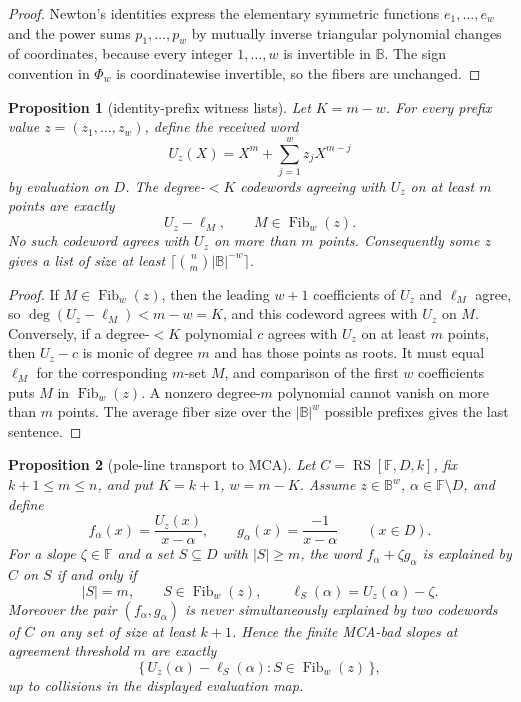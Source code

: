 \documentclass[a4paper,11pt]{amsart}
\newtheorem{proposition}[proposition]{Proposition}
\theoremstyle{remark}
\newcommand{\F}{\mathbb F}
\newcommand{\B}{\mathbb B}
\newcommand{\RS}{\operatorname{RS}}
\newcommand{\Fib}{\operatorname{Fib}}
\begin{document}
\begin{proof}
Newton's identities express the elementary symmetric functions \(e_1,\ldots,e_w\) and the power sums \(p_1,\ldots,p_w\) by mutually inverse triangular polynomial changes of coordinates, because every integer \(1,\ldots,w\) is invertible in \(\B\).  The sign convention in \(\Phi_w\) is coordinatewise invertible, so the fibers are unchanged.
\end{proof}

\begin{proposition}[identity-prefix witness lists]\label{prop:prefix-witness}
Let \(K=m-w\).  For every prefix value \(z=(z_1,\ldots,z_w)\), define the received word
\[
        U_z(X)=X^m+\sum_{j=1}^{w}z_jX^{m-j}
\]
by evaluation on \(D\).  The degree-\(<K\) codewords agreeing with \(U_z\) on at least \(m\) points are exactly
\[
        U_z-\ell_M,\qquad M\in\Fib_w(z).
\]
No such codeword agrees with \(U_z\) on more than \(m\) points.  Consequently some \(z\) gives a list of size at least \(\lceil \binom{n}{m}|\B|^{-w}\rceil\).
\end{proposition}

\begin{proof}
If \(M\in\Fib_w(z)\), then the leading \(w+1\) coefficients of \(U_z\) and \(\ell_M\) agree, so \(\deg(U_z-\ell_M)<m-w=K\), and this codeword agrees with \(U_z\) on \(M\).  Conversely, if a degree-\(<K\) polynomial \(c\) agrees with \(U_z\) on at least \(m\) points, then \(U_z-c\) is monic of degree \(m\) and has those points as roots.  It must equal \(\ell_M\) for the corresponding \(m\)-set \(M\), and comparison of the first \(w\) coefficients puts \(M\) in \(\Fib_w(z)\).  A nonzero degree-\(m\) polynomial cannot vanish on more than \(m\) points.  The average fiber size over the \(|\B|^w\) possible prefixes gives the last sentence.
\end{proof}

\begin{proposition}[pole-line transport to MCA]\label{prop:pole-line}
Let \(C=\RS[\F,D,k]\), fix \(k+1\le m\le n\), and put \(K=k+1\), \(w=m-K\).  Assume \(z\in\B^w\), \(\alpha\in\F\setminus D\), and define
\[
        f_\alpha(x)=\frac{U_z(x)}{x-\alpha},
        \qquad
        g_\alpha(x)=\frac{-1}{x-\alpha}\qquad(x\in D).
\]
For a slope \(\zeta\in\F\) and a set \(S\subseteq D\) with \(|S|\ge m\), the word \(f_\alpha+\zeta g_\alpha\) is explained by \(C\) on \(S\) if and only if
\[
        |S|=m,\qquad S\in\Fib_w(z),\qquad
        \ell_S(\alpha)=U_z(\alpha)-\zeta .
\]
Moreover the pair \((f_\alpha,g_\alpha)\) is never simultaneously explained by two codewords of \(C\) on any set of size at least \(k+1\).  Hence the finite MCA-bad slopes at agreement threshold \(m\) are exactly
\[
        \bigl\{\,U_z(\alpha)-\ell_S(\alpha):S\in\Fib_w(z)\,\bigr\},
\]
up to collisions in the displayed evaluation map.
\end{proposition}
\end{document}
